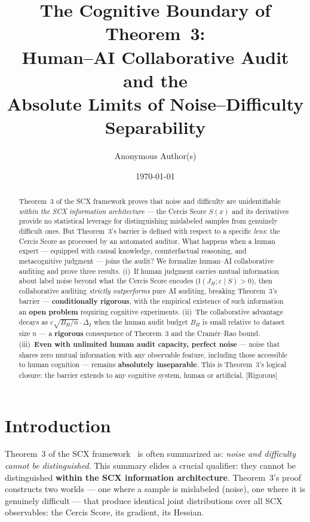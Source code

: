 \documentclass[12pt,a4paper]{article}
\title{\bfseries The Cognitive Boundary of Theorem~3:\\
Human--AI Collaborative Audit and the\\
Absolute Limits of Noise--Difficulty Separability}
\author{Anonymous Author(s)}
\date{\today}
\newcommand{\rigorous}{\textcolor{green!50!black}{\small\textsf{[Rigorous]}}}
\newcommand{\I}{\mathbb{I}}
\begin{document}
\maketitle

\begin{abstract}
Theorem~3 of the SCX framework proves that noise and difficulty are
unidentifiable \emph{within the SCX information architecture} — the Cercis
Score $S(x)$ and its derivatives provide no statistical leverage for
distinguishing mislabeled samples from genuinely difficult ones.  But
Theorem~3's barrier is defined with respect to a specific \emph{lens}: the
Cercis Score as processed by an automated auditor.  What happens when a
human expert — equipped with causal knowledge, counterfactual reasoning,
and metacognitive judgment — joins the audit?  We formalize human--AI
collaborative auditing and prove three results.  (i)~If human judgment
carries mutual information about label noise beyond what the Cercis Score
encodes ($\I(J_H; \varepsilon \mid S) > 0$), then collaborative auditing
\emph{strictly outperforms} pure AI auditing, breaking Theorem~3's barrier
— \textbf{conditionally rigorous}, with the empirical existence of such
information an \textbf{open problem} requiring cognitive experiments.
(ii)~The collaborative advantage decays as $c\sqrt{B_H/n} \cdot \Delta_I$
when the human audit budget $B_H$ is small relative to dataset size $n$ —
a \textbf{rigorous} consequence of Theorem~3 and the Cram\'er--Rao bound.
(iii)~\textbf{Even with unlimited human audit capacity, perfect noise} —
noise that shares zero mutual information with any observable feature,
including those accessible to human cognition — remains \textbf{absolutely
inseparable}.  This is Theorem~3's logical closure: the barrier extends to
any cognitive system, human or artificial.  \rigorous
\end{abstract}

\section{Introduction}

Theorem~3 of the SCX framework~\citep{scx2024cercis} is often summarized as:
\textit{noise and difficulty cannot be distinguished}.  This summary elides a
crucial qualifier: they cannot be distinguished \textbf{within the SCX
information architecture}.  Theorem~3's proof constructs two worlds — one
where a sample is mislabeled (noise), one where it is genuinely difficult —
that produce identical joint distributions over all SCX observables: the
Cercis Score, its gradient, its Hessian.
\end{document}
